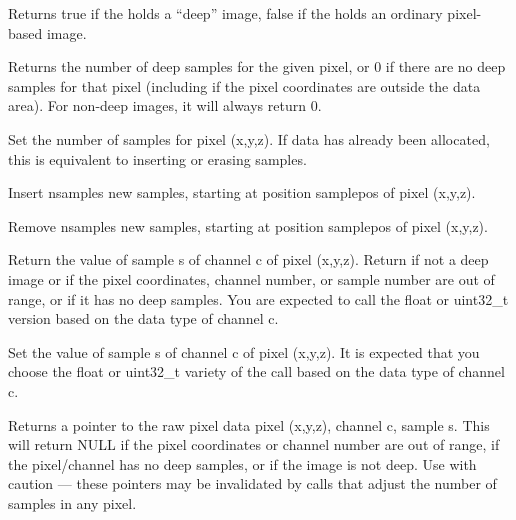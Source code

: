 Returns {\cf true} if the \ImageBuf holds a ``deep'' image, {\cf false}
if the \ImageBuf holds an ordinary pixel-based image.
\apiend

Returns the number of deep samples for the given pixel, or 0 if there
are no deep samples for that pixel (including if the pixel coordinates
are outside the data area).  For non-deep images, it will always return 0.
\apiend

Set the number of samples for pixel {\cf (x,y,z)}. If data has already been
allocated, this is equivalent to inserting or erasing samples.
\apiend

Insert {\cf nsamples} new samples, starting at position {\cf samplepos} of
pixel {\cf (x,y,z)}.
\apiend

Remove {\cf nsamples} new samples, starting at position {\cf samplepos} of
pixel {\cf (x,y,z)}.
\apiend

Return the value of sample {\cf s} of channel {\cf c}
of pixel {\cf (x,y,z)}.  Return {} if not a deep image or if the
pixel coordinates, channel number, or sample number are out of range, or
if it has no deep samples.  You are expected to call the {\cf float} or
{\cf uint32_t} version based on the data type of channel {\cf c}.
\apiend

Set the value of sample {\cf s} of channel {\cf c}
of pixel {\cf (x,y,z)}. It is expected that you choose the {\cf float}
or {\cf uint32_t} variety of the call based on the data type of channel {\cf c}.
\apiend

Returns a pointer to the raw pixel data pixel {\cf (x,y,z)}, channel {\cf c},
sample {\cf s}.  This will return {\cf NULL} if the pixel
coordinates or channel number are out of range, if the pixel/channel has
no deep samples, or if the image is not deep. Use with caution --- these
pointers may be invalidated by calls that adjust the number of samples in
any pixel.
\apiend

